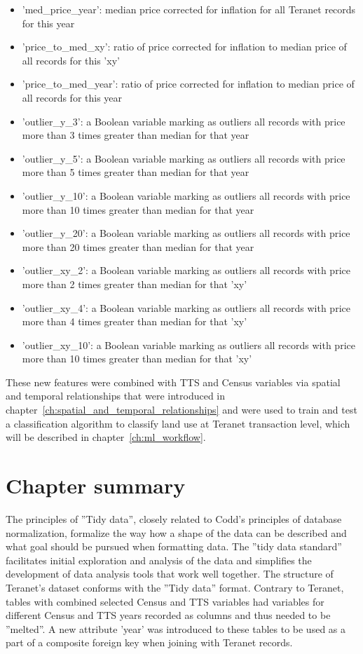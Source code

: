 \begin{itemize}
    \item 'med\_price\_year': median price corrected for inflation for all Teranet records for this year
    \item 'price\_to\_med\_xy': ratio of price corrected for inflation to median price of all records for this 'xy'
    \item 'price\_to\_med\_year': ratio of price corrected for inflation to median price of all records for this year
    \item 'outlier\_y\_3': a Boolean variable marking as outliers all records with price more than 3 times greater than median for that year
    \item 'outlier\_y\_5': a Boolean variable marking as outliers all records with price more than 5 times greater than median for that year
    \item 'outlier\_y\_10': a Boolean variable marking as outliers all records with price more than 10 times greater than median for that year
    \item 'outlier\_y\_20': a Boolean variable marking as outliers all records with price more than 20 times greater than median for that year
    \item 'outlier\_xy\_2': a Boolean variable marking as outliers all records with price more than 2 times greater than median for that 'xy'
    \item 'outlier\_xy\_4': a Boolean variable marking as outliers all records with price more than 4 times greater than median for that 'xy'
    \item 'outlier\_xy\_10': a Boolean variable marking as outliers all records with price more than 10 times greater than median for that 'xy'
\end{itemize}

These new features were combined with TTS and Census variables via spatial and temporal relationships that were introduced in chapter~\ref{ch:spatial_and_temporal_relationships} and were used to train and test a classification algorithm to classify land use at Teranet transaction level, which will be described in chapter~\ref{ch:ml_workflow}.

\section{Chapter summary} \label{sec:data_preparation_summary}

The principles of ''Tidy data'', closely related to Codd's principles of database normalization, formalize the way how a shape of the data can be described and what goal should be pursued when formatting data.
The ''tidy data standard''  facilitates initial exploration and analysis of the data and simplifies the development of data analysis tools that work well together.
The structure of Teranet's dataset conforms with the ''Tidy data'' format.
Contrary to Teranet, tables with combined selected Census and TTS variables had variables for different Census and TTS years recorded as columns and thus needed to be ''melted''.
A new attribute 'year' was introduced to these tables to be used as a part of a composite foreign key when joining with Teranet records.


